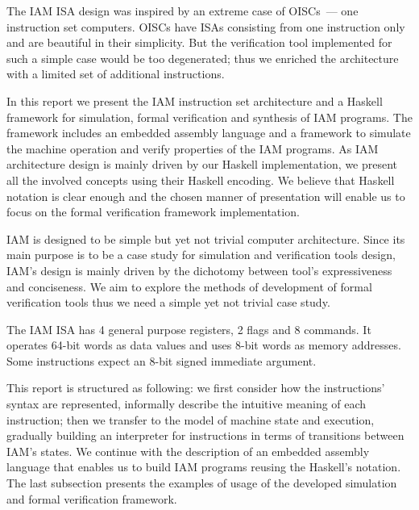 The IAM ISA design was inspired by an extreme case of OISCs~--- one instruction
set computers. OISCs have ISAs consisting from one instruction only and are
beautiful in their simplicity. But the verification tool implemented for such a
simple case would be too degenerated; thus we enriched the architecture with a
limited set of additional instructions.

In this report we present the IAM instruction set architecture and a Haskell
framework for simulation, formal verification and synthesis of IAM programs.
The framework includes an embedded assembly language and a framework to
simulate the machine operation and verify properties of the IAM programs. As
IAM architecture design is mainly driven by our Haskell implementation, we
present all the involved concepts using their Haskell encoding. We believe that
Haskell notation is clear enough and the chosen manner of presentation will
enable us to focus on the formal verification framework implementation.

IAM is designed to be simple but yet not trivial computer architecture. Since
its main purpose is to be a case study for simulation and verification tools
design, IAM's design is mainly driven by the dichotomy between tool's
expressiveness and conciseness. We aim to explore the methods of development of
formal verification tools thus we need a simple yet not trivial case study.

The IAM ISA has 4 general purpose registers, 2 flags and 8 commands. It
operates 64-bit words as data values and uses 8-bit words as memory addresses.
Some instructions expect an 8-bit signed immediate argument.

This report is structured as following: we first consider how the instructions'
syntax are represented, informally describe the intuitive meaning of each
instruction; then we transfer to the model of machine state and execution,
gradually building an interpreter for instructions in terms of transitions
between IAM's states. We continue with the description of an embedded assembly
language that enables us to build IAM programs reusing the Haskell's notation.
The last subsection presents the examples of usage of the developed simulation
and formal verification framework.

\clearpage